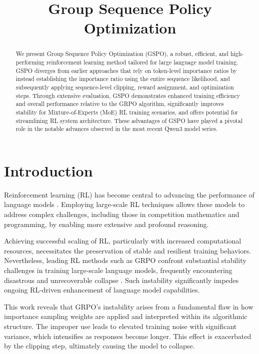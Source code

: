 \title{Group Sequence Policy Optimization}

\begin{abstract}
We present Group Sequence Policy Optimization (GSPO), a robust, efficient, and high-performing reinforcement learning method tailored for large language model training. GSPO diverges from earlier approaches that rely on token-level importance ratios by instead establishing the importance ratio using the entire sequence likelihood, and subsequently applying sequence-level clipping, reward assignment, and optimization steps. Through extensive evaluation, GSPO demonstrates enhanced training efficiency and overall performance relative to the GRPO algorithm, significantly improves stability for Mixture-of-Experts (MoE) RL training scenarios, and offers potential for streamlining RL system architecture. These advantages of GSPO have played a pivotal role in the notable advances observed in the most recent Qwen3 model series.
\end{abstract}

\section{Introduction}
\label{sec:intro}

Reinforcement learning (RL) has become central to advancing the performance of language models \citep{o1,dpsk-r1,qwq32b,qwen3}. Employing large-scale RL techniques allows these models to address complex challenges, including those in competition mathematics and programming, by enabling more extensive and profound reasoning.

Achieving successful scaling of RL, particularly with increased computational resources, necessitates the preservation of stable and resilient training behaviors. Nevertheless, leading RL methods such as GRPO \citep{grpo} confront substantial stability challenges in training large-scale language models, frequently encountering disastrous and unrecoverable collapse \citep{qwen3, minimax-m1}. Such instability significantly impedes ongoing RL-driven enhancement of language model capabilities.

This work reveals that GRPO's instability arises from a fundamental flaw in how importance sampling weights are applied and interpreted within its algorithmic structure. The improper use leads to elevated training noise with significant variance, which intensifies as responses become longer. This effect is exacerbated by the clipping step, ultimately causing the model to collapse.

